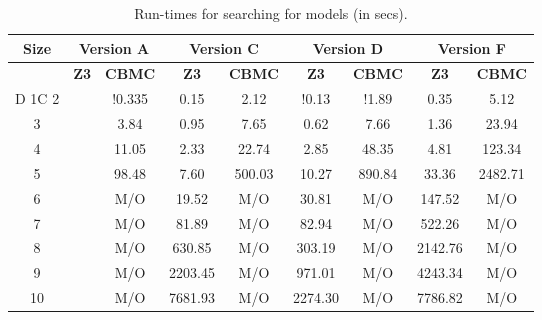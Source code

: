 \begin{table}[t]
  \centering
  \begin{tabular}[t]{|c|c|c|c|c|c|c|c|c|}\hline
    {\multirow{2}{*} \textbf{Size}}  & \multicolumn{2}{c|}{\textbf{Version A}} & \multicolumn{2}{c|}{\textbf{Version C}} & \multicolumn{2}{c|}{\textbf{Version D}}  &  \multicolumn{2}{c|}{\textbf{Version F}} \\\hline
   
   \cline{2-9}
    {} & {\textbf{Z3}} & {\textbf{CBMC}} & {\textbf{Z3}} & {\textbf{CBMC}} & {\textbf{Z3}} & {\textbf{CBMC}} & {\textbf{Z3}} & {\textbf{CBMC}} \\\hline
       D     1C
    2 &  & !0.335 & 0.15 & 2.12 & !0.13 & !1.89 & 0.35 & 5.12 \\\hline
    3 &  & 3.84 & 0.95  & 7.65 & 0.62 & 7.66  & 1.36 & 23.94\\\hline
    4 &  & 11.05 & 2.33 & 22.74 & 2.85 & 48.35  & 4.81 & 123.34\\\hline
    5 &  & 98.48 & 7.60 & 500.03 & 10.27 & 890.84 & 33.36  & 2482.71 \\\hline
    6 &  & M/O & 19.52 & M/O & 30.81 & M/O  & 147.52 & M/O\\\hline
    7 &  & M/O & 81.89 & M/O & 82.94 & M/O & 522.26  & M/O \\\hline
    8 &  & M/O & 630.85 & M/O & 303.19 & M/O & 2142.76 & M/O\\\hline
    9 &  & M/O & 2203.45 & M/O & 971.01 & M/O & 4243.34 & M/O\\\hline
    10 &  & M/O & 7681.93 & M/O & 2274.30 & M/O & 7786.82 & M/O\\\hline
  \end{tabular}
  \caption{Run-times for searching for models (in secs).}
  \label{tab:qbf-grabh}
\end{table}


